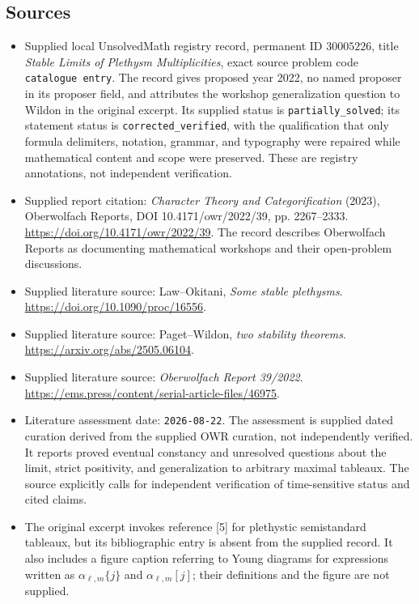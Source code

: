 \documentclass[11pt]{article}
\begin{document}
\subsection{Sources}
\begin{itemize}
\item Supplied local UnsolvedMath registry record, permanent ID \(30005226\), title \emph{Stable Limits of Plethysm Multiplicities}, exact source problem code \texttt{catalogue entry}. The record gives proposed year 2022, no named proposer in its proposer field, and attributes the workshop generalization question to Wildon in the original excerpt. Its supplied status is \texttt{partially\_solved}; its statement status is \texttt{corrected\_verified}, with the qualification that only formula delimiters, notation, grammar, and typography were repaired while mathematical content and scope were preserved. These are registry annotations, not independent verification.
\item Supplied report citation: \emph{Character Theory and Categorification} (2023), Oberwolfach Reports, DOI 10.4171/owr/2022/39, pp. 2267--2333. \url{https://doi.org/10.4171/owr/2022/39}. The record describes Oberwolfach Reports as documenting mathematical workshops and their open-problem discussions.
\item Supplied literature source: Law--Okitani, \emph{Some stable plethysms}. \url{https://doi.org/10.1090/proc/16556}.
\item Supplied literature source: Paget--Wildon, \emph{two stability theorems}. \url{https://arxiv.org/abs/2505.06104}.
\item Supplied literature source: \emph{Oberwolfach Report 39/2022}. \url{https://ems.press/content/serial-article-files/46975}.
\item Literature assessment date: \texttt{2026-08-22}. The assessment is supplied dated curation derived from the supplied OWR curation, not independently verified. It reports proved eventual constancy and unresolved questions about the limit, strict positivity, and generalization to arbitrary maximal tableaux. The source explicitly calls for independent verification of time-sensitive status and cited claims.
\item The original excerpt invokes reference [5] for plethystic semistandard tableaux, but its bibliographic entry is absent from the supplied record. It also includes a figure caption referring to Young diagrams for expressions written as \(\alpha_{\ell,m}\{j\}\) and \(\alpha_{\ell,m}[j]\); their definitions and the figure are not supplied.
\end{itemize}
\end{document}
